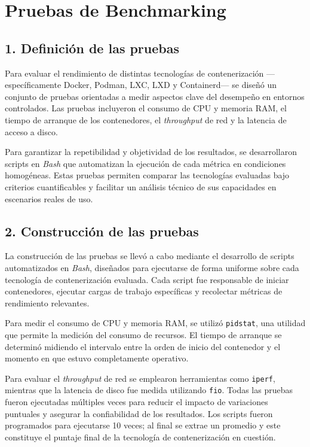 \chapter*{Pruebas de Benchmarking}
\label{cap:benchmarking}

\section*{1. Definición de las pruebas}

Para evaluar el rendimiento de distintas tecnologías de contenerización —específicamente Docker, Podman, LXC, LXD y Containerd— se diseñó un conjunto de pruebas orientadas a medir aspectos clave del desempeño en entornos controlados. Las pruebas incluyeron el consumo de CPU y memoria RAM, el tiempo de arranque de los contenedores, el \textit{throughput} de red y la latencia de acceso a disco. 

Para garantizar la repetibilidad y objetividad de los resultados, se desarrollaron scripts en \textit{Bash} que automatizan la ejecución de cada métrica en condiciones homogéneas. Estas pruebas permiten comparar las tecnologías evaluadas bajo criterios cuantificables y facilitar un análisis técnico de sus capacidades en escenarios reales de uso.

\section*{2. Construcción de las pruebas}

La construcción de las pruebas se llevó a cabo mediante el desarrollo de scripts automatizados en \textit{Bash}, diseñados para ejecutarse de forma uniforme sobre cada tecnología de contenerización evaluada. Cada script fue responsable de iniciar contenedores, ejecutar cargas de trabajo específicas y recolectar métricas de rendimiento relevantes.

Para medir el consumo de CPU y memoria RAM, se utilizó \texttt{pidstat}, una utilidad que permite la medición del consumo de recursos. El tiempo de arranque se determinó midiendo el intervalo entre la orden de inicio del contenedor y el momento en que estuvo completamente operativo. 

Para evaluar el \textit{throughput} de red se emplearon herramientas como \texttt{iperf}, mientras que la latencia de disco fue medida utilizando \texttt{fio}. Todas las pruebas fueron ejecutadas múltiples veces para reducir el impacto de variaciones puntuales y asegurar la confiabilidad de los resultados. Los scripts fueron programados para ejecutarse 10 veces; al final se extrae un promedio y este constituye el puntaje final de la tecnología de contenerización en cuestión.

